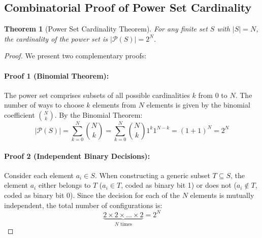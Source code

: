 \documentclass[10pt,journal,compsoc,onecolumn]{IEEEtran}
\newtheorem{theorem}{Theorem}
\begin{document}
\subsection{Combinatorial Proof of Power Set Cardinality}
\begin{theorem}[Power Set Cardinality Theorem]
For any finite set $S$ with $|S| = N$, the cardinality of the power set is $|\mathcal{P}(S)| = 2^N$.
\end{theorem}
\begin{proof}
We present two complementary proofs:
\paragraph{Proof 1 (Binomial Theorem):} The power set comprises subsets of all possible cardinalities $k$ from $0$ to $N$. The number of ways to choose $k$ elements from $N$ elements is given by the binomial coefficient $\binom{N}{k}$. By the Binomial Theorem:
\begin{equation}
|\mathcal{P}(S)| = \sum_{k=0}^N \binom{N}{k} = \sum_{k=0}^N \binom{N}{k} 1^k 1^{N-k} = (1 + 1)^N = 2^N
\end{equation}

\paragraph{Proof 2 (Independent Binary Decisions):} Consider each element $a_i \in S$. When constructing a generic subset $T \subseteq S$, the element $a_i$ either belongs to $T$ ($a_i \in T$, coded as binary bit 1) or does not ($a_i \notin T$, coded as binary bit 0). Since the decision for each of the $N$ elements is mutually independent, the total number of configurations is:
\begin{equation}
\underbrace{2 \times 2 \times \dots \times 2}_{N \text{ times}} = 2^N
\end{equation}
\end{proof}
\end{document}
